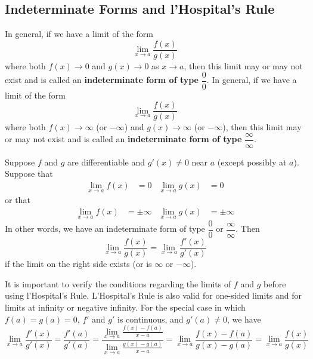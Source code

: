\subsection{Indeterminate Forms and l'Hospital's Rule}

In general, if we have a limit of the form
\[\lim_{x\to a}\frac{f(x)}{g(x)}\]
where both \(f(x)\to 0\) and \(g(x)\to 0\) as \(x\to a\), then this limit may
or may not exist and is called an \textbf{indeterminate form of type}
\(\dfrac{0}{0}\).
In general, if we have a limit of the form
\[\lim_{x\to a}\frac{f(x)}{g(x)}\]
where both \(f(x)\to\infty\) (or \(-\infty\)) and \(g(x)\to\infty\)
(or \(-\infty\)), then this limit may or may not exist and is called an
\textbf{indeterminate form of type} \(\dfrac{\infty}{\infty}\).
\begin{theorem}
    Suppose \(f\) and \(g\) are differentiable and \(g'(x)\neq 0\) near \(a\)
    (except possibly at \(a\)).
    Suppose that
    \begin{align*}
        \lim_{x\to a}f(x) &= 0 & \lim_{x\to a}g(x) &= 0
    \end{align*}
    or that
    \begin{align*}
        \lim_{x\to a}f(x) &= \pm\infty & \lim_{x\to a}g(x) &= \pm\infty
    \end{align*}
    In other words, we have an indeterminate form of type \(\dfrac{0}{0}\) or
    \(\dfrac{\infty}{\infty}\).
    Then
    \[\lim_{x\to a}\frac{f(x)}{g(x)}=\lim_{x\to a}\frac{f'(x)}{g'(x)}\]
    if the limit on the right side exists (or is \(\infty\) or \(-\infty\)).
\end{theorem}
It is important to verify the conditions regarding the limits of \(f\) and \(g\) before using
l'Hospital's Rule.
L'Hospital's Rule is also valid for one-sided limits and for limits at
infinity or negative infinity.
For the special case in which \(f(a)=g(a)=0\), \(f'\) and \(g'\) is
continuous, and \(g'(a)\neq 0\), we have
\[\lim_{x\to a}\frac{f'(x)}{g'(x)}=\frac{f'(a)}{g'(a)}
= \frac{\displaystyle{\lim_{x\to a}\frac{f(x)-f(a)}{x-a}}}
{\displaystyle{\lim_{x\to a}\frac{g(x)-g(a)}{x-a}}}
=\lim_{x\to a}\frac{f(x)-f(a)}{g(x)-g(a)}=\lim_{x\to a}\frac{f(x)}{g(x)}\]

